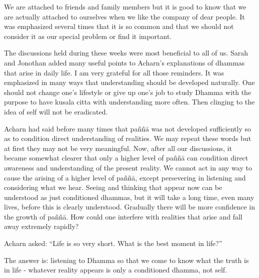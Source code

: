 We are attached to friends and family members but it is good to know that we 
are actually attached to ourselves when we like the company of dear people. It 
was emphasized several times that it is so common and that we should not consider it as our special problem or find it important. 

The discussions held during these weeks were most beneficial to all of us. Sarah 
and Jonothan added many useful points to Acharn's explanations of dhammas 
that arise in daily life. I am very grateful for all those reminders. It was emphasized in many ways that understanding should be developed naturally. One 
should not change one's lifestyle or give up one's job to study Dhamma with 
the purpose to have kusala citta with understanding more often. Then clinging 
to the idea of self will not be eradicated. 

Acharn had said before many times that paññā was not developed sufficiently so 
as to condition direct understanding of realities. We may repeat these words but 
at first they may not be very meaningful. Now, after all our discussions, it became somewhat clearer that only a higher level of paññā can condition direct 
awareness and understanding of the present reality. We cannot act in any way to 
cause the arising of a higher level of paññā, except persevering in listening and 
considering what we hear. Seeing and thinking that appear now can be understood as just conditioned dhammas, but it will take a long time, even many lives, before this is clearly understood. Gradually there will be more confidence 
in the growth of paññā. How could one interfere with realities that arise and fall 
away extremely rapidly? 

Acharn asked: ``Life is so very short. What is the best moment in life?'' 

The answer is: listening to Dhamma so that we come to know what the truth is 
in life - whatever reality appears is only a conditioned dhamma, not self. 
